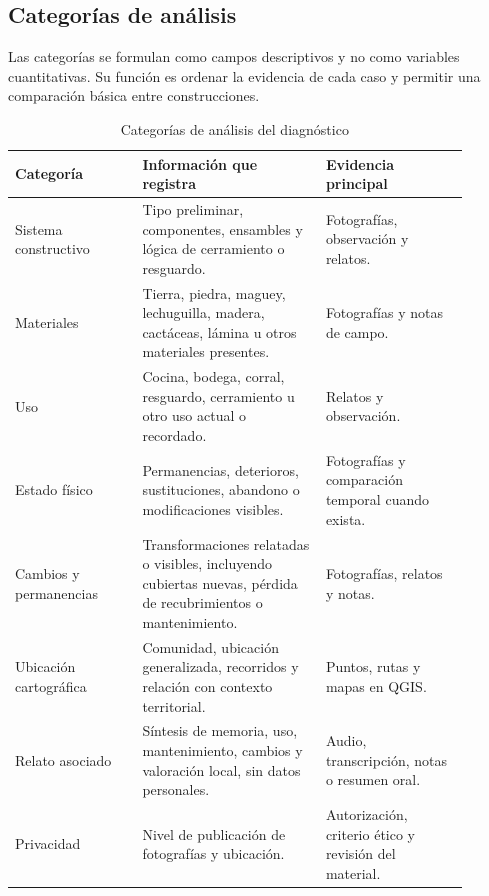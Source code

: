 \subsection{Categorías de análisis}

Las categorías se formulan como campos descriptivos y no como variables cuantitativas. Su función es ordenar la evidencia de cada caso y permitir una comparación básica entre construcciones.

\begin{table}[ht]
  \centering
  \caption{Categorías de análisis del diagnóstico}
  \vspace{0.25cm}
  \label{tab:categorias_analisis}
  \begin{tabular}{@{}L{0.25\linewidth}L{0.36\linewidth}L{0.29\linewidth}@{}}
    \toprule
    \textbf{Categoría} & \textbf{Información que registra} & \textbf{Evidencia principal} \\
    \midrule
    Sistema constructivo & Tipo preliminar, componentes, ensambles y lógica de cerramiento o resguardo. & Fotografías, observación y relatos. \\
    Materiales & Tierra, piedra, maguey, lechuguilla, madera, cactáceas, lámina u otros materiales presentes. & Fotografías y notas de campo. \\
    Uso & Cocina, bodega, corral, resguardo, cerramiento u otro uso actual o recordado. & Relatos y observación. \\
    Estado físico & Permanencias, deterioros, sustituciones, abandono o modificaciones visibles. & Fotografías y comparación temporal cuando exista. \\
    Cambios y permanencias & Transformaciones relatadas o visibles, incluyendo cubiertas nuevas, pérdida de recubrimientos o mantenimiento. & Fotografías, relatos y notas. \\
    Ubicación cartográfica & Comunidad, ubicación generalizada, recorridos y relación con contexto territorial. & Puntos, rutas y mapas en QGIS. \\
    Relato asociado & Síntesis de memoria, uso, mantenimiento, cambios y valoración local, sin datos personales. & Audio, transcripción, notas o resumen oral. \\
    Privacidad & Nivel de publicación de fotografías y ubicación. & Autorización, criterio ético y revisión del material. \\
    \bottomrule
  \end{tabular}
\end{table}

